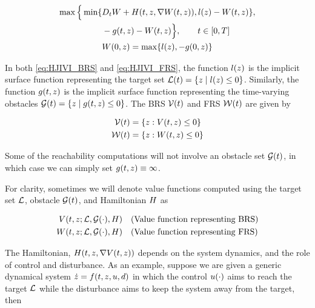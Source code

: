 \begin{equation}
\label{eq:HJIVI_FRS}
\begin{aligned}
\max \Big\{ \min \{&D_t \valfuncfwd + \ham(t, \state, \nabla \valfuncfwd(t, \state)), \ic(\state) - \valfuncfwd(t, \state) \}, \\
&-\obsfunc(t, \state) - \valfuncfwd(t, \state) \Big\}, \qquad t \in [0, T] \\
&\valfuncfwd(0, \state) = \max\{\fc(\state), -\obsfunc(0, \state)\}
\end{aligned}
\end{equation}

In both \eqref{eq:HJIVI_BRS} and \eqref{eq:HJIVI_FRS}, the function $l(z)$ is the implicit surface function representing the target set $\mathcal{L}(t) = \{z \mid l(z) \le 0\}$. Similarly, the function $g(t, z)$ is the implicit surface function representing the time-varying obstacles $\mathcal{G}(t) = \{z \mid g(t,z)\le 0\}$. The BRS $\mathcal{V}(t)$ and FRS $\mathcal{W}(t)$ are given by

\begin{equation}
\label{eq:implicitValfuncs}
\begin{aligned}
\brs(t) &= \{\state: \valfunc(t, \state) \le 0\} \\
\frs(t) &= \{\state: \valfuncfwd(t, \state) \le 0 \}
\end{aligned}
\end{equation}

Some of the reachability computations will not involve an obstacle set $\mathcal{G}(t)$, in which case we can simply set $g(t, z) \equiv \infty$.

 For clarity, sometimes we will denote value functions computed using the target set $\mathcal{L}$, obstacle $\mathcal{G}(t)$, and Hamiltonian $H$ as 

\begin{equation}
\begin{aligned}
V(t, z; \mathcal{L}, \mathcal{G}(\cdot), H) &\quad \text{(Value function representing BRS)} \\
W(t, z; \mathcal{L}, \mathcal{G}(\cdot), H) &\quad \text{(Value function representing FRS)}
\end{aligned}
\end{equation}

The Hamiltonian, $H(t, z, \nabla V(t,z))$ depends on the system dynamics, and the role of control and disturbance. As an example, suppose we are given a generic dynamical system $\dot {z} = f(t, z, u, d)$ in which the control $u(\cdot)$ aims to reach the target $\mathcal{L}$ while the disturbance aims to keep the system away from the target, then


